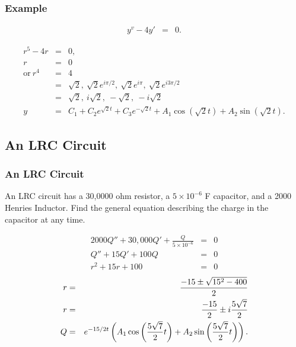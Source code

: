 \begin{frame}
  \frametitle{Example}

  \begin{eqnarray*}
    y^v - 4 y'& = & 0.
  \end{eqnarray*}

  {
    \begin{eqnarray*}
      r^5 - 4r & = & 0, \\
      r & = & 0 \\
      \mathrm{or~} r^4 & = & 4 \\
      & = & \sqrt{2},~\sqrt{2}e^{i \pi/2}, ~ \sqrt{2}e^{i \pi},~ \sqrt{2}e^{i 3\pi/2} \\
      & = & \sqrt{2},~i\sqrt{2},~-\sqrt{2},~-i\sqrt{2} \\
      y & = & C_1 + C_2 e^{\sqrt{2}t} + C_3 e^{-\sqrt{2}t} +
      A_1 \cos(\sqrt{2}t) + A_2 \sin(\sqrt{2}t).
    \end{eqnarray*}
  }


\end{frame}

\subsection{An LRC Circuit}

\begin{frame}
  \frametitle{An LRC Circuit}

  An LRC circuit has a 30,0000 ohm resistor, a $5\times 10^{-6}$ F
  capacitor, and a 2000 Henries Inductor. Find the general equation
  describing  the charge in the capacitor at any time.

  {
    \begin{eqnarray*}
      2000 Q'' + 30,000 Q' + \frac{Q}{5\times 10^{-6}} & = & 0 \\
      Q'' + 15 Q' + 100 Q & = & 0 \\
      r^2 + 15 r + 100 & = & 0
    \end{eqnarray*}
    \begin{eqnarray*}
      r & = & \frac{-15\pm\sqrt{15^2-400}}{2} \\
      r & = & \frac{-15}{2} \pm i\frac{5\sqrt{7}}{2} \\
      Q & = & e^{-15/2 t}
      \left( A_1 \cos\left( \frac{5\sqrt{7}}{2} t\right) + A_2 \sin\left( \frac{5\sqrt{7}}{2} t \right) \right).
    \end{eqnarray*}

  }

\end{frame}

